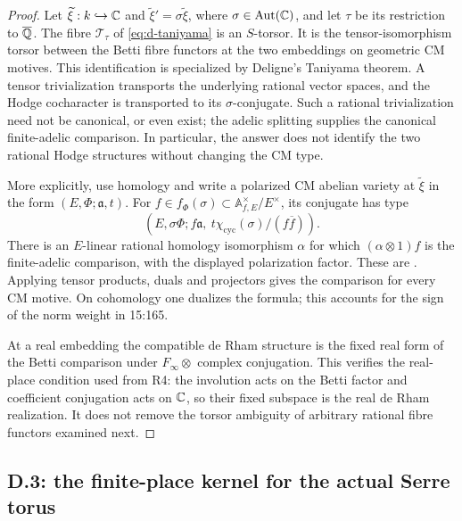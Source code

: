 \begin{proof}
Let $\widetilde\xi:k\hookrightarrow\mathbb C$ and
$\widetilde\xi'=\sigma\widetilde\xi$, where
$\sigma\in\operatorname{Aut}(\mathbb C)$, and let $\tau$ be its restriction to
$\overline{\mathbb Q}$.  The fibre $\mathcal T_\tau$ of
\eqref{eq:d-taniyama} is an $S$-torsor.  It is the tensor-isomorphism
torsor between the Betti fibre functors at the two embeddings on
geometric CM motives.  This identification is
\citet[Proposition 8.23(c)--(d)]{c_delignehodge1982} specialized by
Deligne's Taniyama theorem.  A tensor trivialization transports the
underlying rational vector spaces, and the Hodge cocharacter is
transported to its $\sigma$-conjugate.  Such a rational trivialization
need not be canonical, or even exist; the adelic splitting supplies
the canonical finite-adelic comparison.  In particular, the answer
does not identify the two rational Hodge structures without changing
the CM type.

More explicitly, use homology and write a polarized CM abelian
variety at $\widetilde\xi$ in the form
$(E,\Phi;\mathfrak a,t)$.  For
$f\in f_\Phi(\sigma)\subset\mathbb A_{f,E}^{\times}/E^\times$,
its conjugate has type
\begin{equation}
 (E,\sigma\Phi;
       f\mathfrak a,\ t\chi_{\mathrm{cyc}}(\sigma)/(f\overline f)).
 \label{eq:d-conjugate-cm-type}
\end{equation}
There is an $E$-linear rational homology isomorphism $\alpha$ for
which $(\alpha\otimes1)f$ is the finite-adelic comparison, with
the displayed polarization factor.  These are
\citet[Theorems 1.1 and 1.3]{DMilnePedestrians}.
Applying tensor products, duals and projectors gives the comparison
for every CM motive.  On cohomology one dualizes the formula; this
accounts for the sign of the norm weight in 15:165.

At a real embedding the compatible de Rham structure is the fixed
real form of the Betti comparison under
$F_\infty\otimes$ complex conjugation.  This verifies the real-place
condition used from R4: the involution acts on the Betti factor and
coefficient conjugation acts on $\mathbb C$, so their fixed subspace is
the real de Rham realization.  It does not remove the torsor ambiguity
of arbitrary rational fibre functors examined next.
\end{proof}

\subsection{D.3: the finite-place kernel for the actual Serre torus}
\label{subsec:d3}

